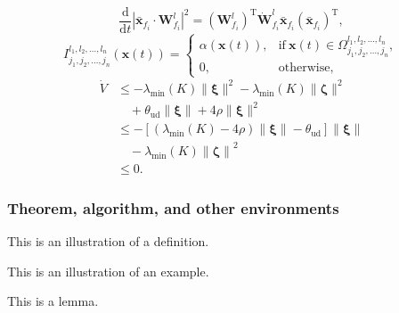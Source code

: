 \documentclass[twoside,twocolumn]{article}
\begin{document}
\begin{equation}
\frac{\mathrm{d}}{\mathrm{d}t} {| \bar{\bm{x}}_{f_i} \cdot {\bm{W}}_{f_i}^l |^2 }= ({{\bm{W}}_{f_i}^l})^\mathrm{T} \dot {\bm{W}}_{f_i}^l \bar {\bm{x}}_{f_i} ({\bar {\bm{x}}_{f_i}})^\mathrm{T},
\end{equation}
\begin{equation}\label{indicatorfunc}
I_{j_1, j_2, \ldots, j_n}^{l_1, l_2, \ldots, l_n} (\bm{x}(t))= 
	\begin{cases}
		\alpha(\bm{x}(t)), & \mathrm{if}\ \bm{x}(t) \in \Omega_{j_1, j_2, \ldots, j_n}^{l_1, l_2, \ldots, l_n}, \\
		0,                 & \mathrm{otherwise},
	\end{cases}
\end{equation}
\begin{equation}\label{eqn:Lyapdisturb1}
\begin{aligned}
	\dot{V} & \leq  - \lambda_{\min} ( K ) \| \bm{\xi} \|^2 - \lambda_{\min} ( K ) \| \bm{\zeta} \|^2                       \\
	        & \quad + \theta_\mathrm{ud} \| \bm{\xi} \| + 4 \rho \| \bm{\xi} \|^2                                           \\
	        & \leq  - \left[ ( \lambda_{\min} ( K )- 4 \rho ) \| \bm{\xi} \|  -  \theta_\mathrm{ud}  \right] \| \bm{\xi} \| \\
	        & \quad -\lambda_{\min} ( K ) \left\| \bm{\zeta} \right\|^2                                                     \\
	        & \leq 0.
\end{aligned}
\end{equation}


\subsubsection{Theorem, algorithm, and other environments}

\begin{definition}
This is an illustration of a definition.
\end{definition}

\begin{example}
This is an illustration of an example.
\end{example}

\begin{lemma}
This is a lemma.
\end{lemma}
\end{document}
